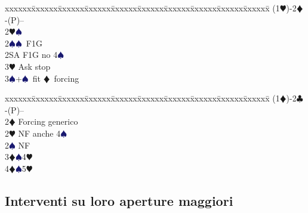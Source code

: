 \documentclass[a4paper,italian]{article}
\newcommand{\BC}{\textcolor{OliveGreen}{$\clubsuit$}}
\newcommand{\BD}{\textcolor{RedOrange}{$\vardiamondsuit$}}
\newcommand{\BH}{\textcolor{Red2}{$\varheartsuit${}}}
\newcommand{\BS}{\textcolor{MidnightBlue}{$\spadesuit${}}}
\newenvironment{bidtable}
{\begin{tabbing}

    xxxxxx\=xxxxxx\=xxxxxx\=xxxxxx\=xxxxxx\=xxxxxx\=xxxxxx\=xxxxxx\=xxxxxx\=xxxxxx\=\kill}
{\end{tabbing} }%
\begin{document}
\begin{multicols}{2}
                                        \begin{bidtable}
                                            (1\BH)-2\BD-(P)--\\
                                            2\BH {}\BS \\
                                            2\BS {}\BS\ F1G\\
                                            2SA \> F1G no 4\BS \\
                                            3\BH \> Ask stop\\
                                            3\BS {}+\BS\ fit \BD\ forcing
                                        \end{bidtable}
                                        \begin{bidtable}
                                            (1\BD)-2\BC-(P)--\\
                                            2\BD \> Forcing generico\\
                                            2\BH \> NF anche 4\BS \\
                                            2\BS \> NF\\
                                            3\BD {}\BS 4\BH \\
                                            4\BD {}\BS 5\BH
                                        \end{bidtable}


                                        \subsection{Interventi su loro aperture maggiori}


\end{multicols}
\end{document}
